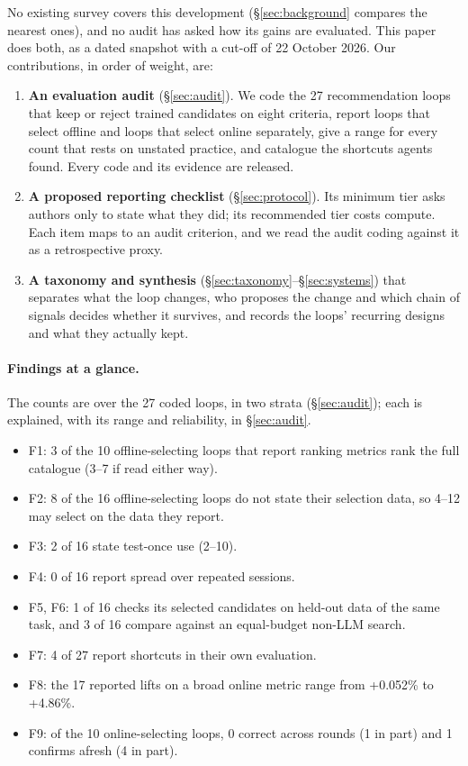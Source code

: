 \documentclass[sigconf,nonacm]{acmart}
\begin{document}


No existing survey covers this development (\S\ref{sec:background} compares the nearest ones), and no audit has
asked how its gains are evaluated. This paper does both, as a dated snapshot with a cut-off of 22 October 2026. Our
contributions, in order of weight, are:
\begin{enumerate}
\item \textbf{An evaluation audit} (\S\ref{sec:audit}). We code the 27 recommendation loops that keep or reject
trained candidates on eight criteria, report loops that select offline and loops that select online separately, give
a range for every count that rests on unstated practice, and catalogue the shortcuts agents found. Every code and its
evidence are released.
\item \textbf{A proposed reporting checklist} (\S\ref{sec:protocol}). Its minimum tier asks authors only to state what
they did; its recommended tier costs compute. Each item maps to an audit criterion, and we read the audit coding
against it as a retrospective proxy.
\item \textbf{A taxonomy and synthesis} (\S\ref{sec:taxonomy}--\S\ref{sec:systems}) that separates what the loop
changes, who proposes the change and which chain of signals decides whether it survives, and records the loops'
recurring designs and what they actually kept.
\end{enumerate}

\paragraph{Findings at a glance.} The counts are over the 27 coded loops, in two strata (\S\ref{sec:audit}); each
is explained, with its range and reliability, in \S\ref{sec:audit}.
\begin{itemize}
\item F1: 3 of the 10 offline-selecting loops that report ranking metrics rank the full catalogue (3--7 if read either way).
\item F2: 8 of the 16 offline-selecting loops do not state their selection data, so 4--12 may select on the data they report.
\item F3: 2 of 16 state test-once use (2--10).
\item F4: 0 of 16 report spread over repeated sessions.
\item F5, F6: 1 of 16 checks its selected candidates on held-out data of the same task, and 3 of 16 compare against an equal-budget non-LLM search.
\item F7: 4 of 27 report shortcuts in their own evaluation.
\item F8: the 17 reported lifts on a broad online metric range from +0.052\% to +4.86\%.
\item F9: of the 10 online-selecting loops, 0 correct across rounds (1 in part) and 1 confirms afresh (4 in part).
\end{itemize}
\end{document}
